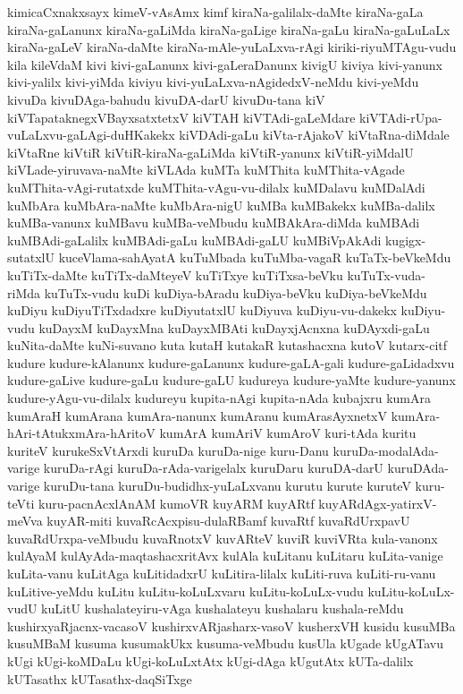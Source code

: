 {kimicaCxnakxsayx
kimeV-vAsAmx
kimf
kiraNa-galilalx-daMte
kiraNa-gaLa
kiraNa-gaLanunx
kiraNa-gaLiMda
kiraNa-gaLige
kiraNa-gaLu
kiraNa-gaLuLaLx
kiraNa-gaLeV
kiraNa-daMte
kiraNa-mAle-yuLaLxva-rAgi
kiriki-riyuMTAgu-vudu
kila
kileVdaM
kivi
kivi-gaLanunx
kivi-gaLeraDanunx
kivigU
kiviya
kivi-yanunx
kivi-yalilx
kivi-yiMda
kiviyu
kivi-yuLaLxva-nAgidedxV-neMdu
kivi-yeMdu
kivuDa
kivuDAga-bahudu
kivuDA-darU
kivuDu-tana
kiV
kiVTapataknegxVBayxsatxtetxV
kiVTAH
kiVTAdi-gaLeMdare
kiVTAdi-rUpa-vuLaLxvu-gaLAgi-duHKakekx
kiVDAdi-gaLu
kiVta-rAjakoV
kiVtaRna-diMdale
kiVtaRne
kiVtiR
kiVtiR-kiraNa-gaLiMda
kiVtiR-yanunx
kiVtiR-yiMdalU
kiVLade-yiruvava-naMte
kiVLAda
kuMTa
kuMThita
kuMThita-vAgade
kuMThita-vAgi-rutatxde
kuMThita-vAgu-vu-dilalx
kuMDalavu
kuMDalAdi
kuMbAra
kuMbAra-naMte
kuMbAra-nigU
kuMBa
kuMBakekx
kuMBa-dalilx
kuMBa-vanunx
kuMBavu
kuMBa-veMbudu
kuMBAkAra-diMda
kuMBAdi
kuMBAdi-gaLalilx
kuMBAdi-gaLu
kuMBAdi-gaLU
kuMBiVpAkAdi
kugigx-sutatxlU
kuceVlama-sahAyatA
kuTuMbada
kuTuMba-vagaR
kuTaTx-beVkeMdu
kuTiTx-daMte
kuTiTx-daMteyeV
kuTiTxye
kuTiTxsa-beVku
kuTuTx-vuda-riMda
kuTuTx-vudu
kuDi
kuDiya-bAradu
kuDiya-beVku
kuDiya-beVkeMdu
kuDiyu
kuDiyuTiTxdadxre
kuDiyutatxlU
kuDiyuva
kuDiyu-vu-dakekx
kuDiyu-vudu
kuDayxM
kuDayxMna
kuDayxMBAti
kuDayxjAcnxna
kuDAyxdi-gaLu
kuNita-daMte
kuNi-suvano
kuta
kutaH
kutakaR
kutashacxna
kutoV
kutarx-citf
kudure
kudure-kAlanunx
kudure-gaLanunx
kudure-gaLA-gali
kudure-gaLidadxvu
kudure-gaLive
kudure-gaLu
kudure-gaLU
kudureya
kudure-yaMte
kudure-yanunx
kudure-yAgu-vu-dilalx
kudureyu
kupita-nAgi
kupita-nAda
kubajxru
kumAra
kumAraH
kumArana
kumAra-nanunx
kumAranu
kumArasAyxnetxV
kumAra-hAri-tAtukxmAra-hAritoV
kumArA
kumAriV
kumAroV
kuri-tAda
kuritu
kuriteV
kurukeSxVtArxdi
kuruDa
kuruDa-nige
kuru-Danu
kuruDa-modalAda-varige
kuruDa-rAgi
kuruDa-rAda-varigelalx
kuruDaru
kuruDA-darU
kuruDAda-varige
kuruDu-tana
kuruDu-budidhx-yuLaLxvanu
kurutu
kurute
kuruteV
kuru-teVti
kuru-pacnAcxlAnAM
kumoVR
kuyARM
kuyARtf
kuyARdAgx-yatirxV-meVva
kuyAR-miti
kuvaRcAcxpisu-dulaRBamf
kuvaRtf
kuvaRdUrxpavU
kuvaRdUrxpa-veMbudu
kuvaRnotxV
kuvARteV
kuviR
kuviVRta
kula-vanonx
kulAyaM
kulAyAda-maqtashacxritAvx
kulAla
kuLitanu
kuLitaru
kuLita-vanige
kuLita-vanu
kuLitAga
kuLitidadxrU
kuLitira-lilalx
kuLiti-ruva
kuLiti-ru-vanu
kuLitive-yeMdu
kuLitu
kuLitu-koLuLxvaru
kuLitu-koLuLx-vudu
kuLitu-koLuLx-vudU
kuLitU
kushalateyiru-vAga
kushalateyu
kushalaru
kushala-reMdu
kushirxyaRjacnx-vacasoV
kushirxvARjasharx-vasoV
kusherxVH
kusidu
kusuMBa
kusuMBaM
kusuma
kusumakUkx
kusuma-veMbudu
kusUla
kUgade
kUgATavu
kUgi
kUgi-koMDaLu
kUgi-koLuLxtAtx
kUgi-dAga
kUgutAtx
kUTa-dalilx
kUTasathx
kUTasathx-daqSiTxge
}
